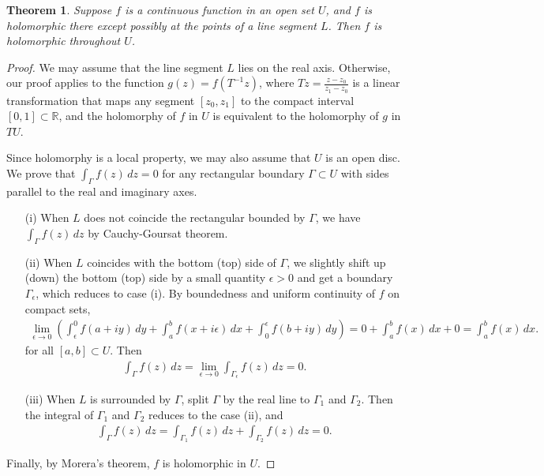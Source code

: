 \documentclass{article}
\numberwithin{equation}{section}
\newcommand{\bbR}{\mathbb{R}}
\theoremstyle{plain}
\newtheorem{theorem}{Theorem}[section]
\theoremstyle{definition}
\begin{document}
\begin{theorem}\label{segmentext}
Suppose $f$ is a continuous function in an open set $U$, and $f$ is holomorphic there except possibly at the
points of a line segment $L$. Then $f$ is holomorphic throughout $U$.
\end{theorem}
\begin{proof}
We may assume that the line segment $L$ lies on the real axis. Otherwise,  our proof applies to the function $g(z)=f(T^{-1}z)$, where $Tz=\frac{z-z_0}{z_1-z_0}$ is a linear transformation that maps any segment $[z_0,z_1]$ to the compact interval $[0,1]\subset\bbR$, and the holomorphy of $f$ in $U$ is equivalent to the holomorphy of $g$ in $TU$.

Since holomorphy is a local property, we may also assume that $U$ is an open disc. We prove that $\int_\Gamma f(z)\,dz=0$ for any rectangular boundary $\Gamma\subset U$  with
sides parallel to the real and imaginary axes.
\begin{itemize}
\item[(i)] When $L$ does not coincide the rectangular bounded by $\Gamma$, we have $\int_\Gamma f(z)\,dz$ by Cauchy-Goursat theorem.
\item[(ii)] When $L$ coincides with the bottom (top) side of $\Gamma$, we slightly shift up (down) the bottom (top) side by a small quantity $\epsilon>0$ and get a boundary $\Gamma_\epsilon$, which reduces to case (i). By boundedness and uniform continuity of $f$ on compact sets,
\begin{align*}
	\lim_{\epsilon\to 0}\left(\int_\epsilon^0 f(a+iy)\,dy+\int_a^b f(x+i\epsilon)\,dx+\int_0^\epsilon f(b+iy)\,dy\right)=0+\int_a^b f(x)\,dx+0=\int_a^b f(x)\,dx.
\end{align*}
for all $[a,b]\subset U$. Then
\begin{align*}
	\int_\Gamma f(z)\,dz=\lim_{\epsilon\to 0}\int_{\Gamma_\epsilon} f(z)\,dz=0.
\end{align*}
\item[(iii)] When $L$ is surrounded by $\Gamma$, split $\Gamma$ by the real line to $\Gamma_1$ and $\Gamma_2$. Then the integral of $\Gamma_1$ and $\Gamma_2$ reduces to the case (ii), and
\begin{align*}
	\int_{\Gamma}f(z)\,dz=\int_{\Gamma_1}f(z)\,dz+\int_{\Gamma_2}f(z)\,dz=0.
\end{align*}
\end{itemize}
Finally, by Morera's theorem, $f$ is holomorphic in $U$.
\end{proof}
\end{document}
